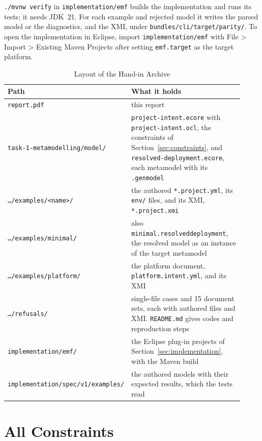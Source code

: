\texttt{./mvnw verify} in \texttt{implementation/emf} builds the implementation
and runs its tests; it needs JDK~21. For each example and rejected model it
writes the parsed model or the diagnostics, and the XMI, under
\texttt{bundles/cli/}\allowbreak\texttt{target/parity/}. To open the implementation in Eclipse,
import \texttt{implementation/emf} with File > Import > Existing Maven Projects
after setting \texttt{emf.target} as the target platform.

\begin{table}[!htbp]
\centering
\footnotesize
\begin{tabular}{>{\raggedright\arraybackslash}p{0.36\linewidth}>{\raggedright\arraybackslash}p{0.56\linewidth}}
\hline
\textbf{Path} & \textbf{What it holds} \\
\hline
\texttt{report.pdf} & this report \\
\texttt{task-1-metamodelling/model/} & \texttt{project-intent.ecore} with \texttt{project-intent.ocl}, the constraints of Section~\ref{sec:constraints}, and \texttt{resolved-deployment.ecore}, each metamodel with its \texttt{.genmodel} \\
\texttt{\dots/examples/<name>/} & the authored \texttt{*.project.yml}, its \texttt{env/} files, and its XMI, \texttt{*.project.xmi} \\
\texttt{\dots/examples/minimal/} & also \texttt{minimal.resolveddeployment}, the resolved model as an instance of the target metamodel \\
\texttt{\dots/examples/platform/} & the platform document, \texttt{platform.intent.yml}, and its XMI \\
\texttt{\dots/refusals/} & 18 single-file cases and 15 document sets, each with authored files and XMI. \texttt{README.md} gives codes and reproduction steps \\
\texttt{implementation/emf/} & the Eclipse plug-in projects of Section~\ref{sec:implementation}, with the Maven build \\
\texttt{implementation/spec/v1/examples/} & the authored models with their expected results, which the tests read \\
\hline
\end{tabular}
\caption{Layout of the Hand-in Archive}
\label{tab:handin}
\end{table}

\clearpage
\section{All Constraints}
\label{sec:allconstraints}

